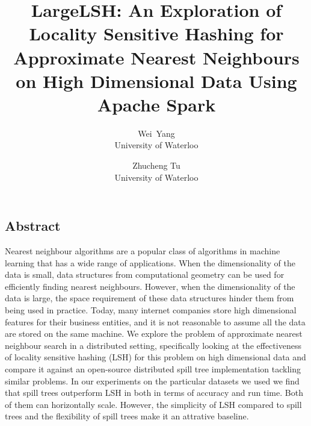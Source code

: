 \documentclass[letterpaper,twocolumn,10pt]{article}
\theoremstyle{definition}
\begin{document}
\date{}

\title{\Large \bf LargeLSH: An Exploration of Locality Sensitive 
Hashing for Approximate Nearest Neighbours on High Dimensional Data Using Apache 
Spark}

\author{
{\rm Wei\ Yang}\\
University of Waterloo
\and
{\rm Zhucheng Tu}\\
University of Waterloo
} %

\maketitle

\thispagestyle{empty}


\subsection*{Abstract}

Nearest neighbour algorithms are a popular class of algorithms in machine learning 
that has a wide range of applications. When the dimensionality of the data is 
small, data structures from computational geometry can be used  
for efficiently finding nearest neighbours. However, when the dimensionality of the 
data is large, the space requirement of these data structures hinder them from 
being used in practice. Today, many internet companies store high dimensional 
features for their business entities, and it is not reasonable to assume all the 
data are stored on the same machine. We explore the problem of approximate nearest 
neighbour search in a distributed setting, specifically looking at the 
effectiveness of locality sensitive hashing (LSH) for this problem on high 
dimensional data and compare it against an open-source distributed spill tree implementation tackling 
similar problems. In our experiments on the particular datasets we used we find that spill trees 
outperform LSH in both in terms of accuracy and run time. Both of them can horizontally scale. 
However, the simplicity of LSH compared to spill trees and the flexibility of spill trees make it an 
attrative baseline.
\end{document}
